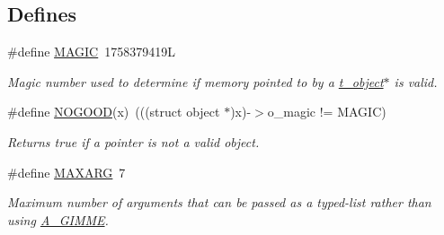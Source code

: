 \subsection*{Defines}
\begin{DoxyCompactItemize}
\item 
\hypertarget{group__obj_ga94630370ae389fb1189282fa0742f310}{
\#define \hyperlink{group__obj_ga94630370ae389fb1189282fa0742f310}{MAGIC}~1758379419L}
\label{group__obj_ga94630370ae389fb1189282fa0742f310}

\begin{DoxyCompactList}\small\item\em Magic number used to determine if memory pointed to by a \hyperlink{structt__object}{t\_\-object}$\ast$ is valid. \item\end{DoxyCompactList}\item 
\hypertarget{group__obj_gabf8c1d20a4f4e731d185c02820c91593}{
\#define \hyperlink{group__obj_gabf8c1d20a4f4e731d185c02820c91593}{NOGOOD}(x)~(((struct object $\ast$)x)-\/$>$o\_\-magic != MAGIC)}
\label{group__obj_gabf8c1d20a4f4e731d185c02820c91593}

\begin{DoxyCompactList}\small\item\em Returns true if a pointer is not a valid object. \item\end{DoxyCompactList}\item 
\#define \hyperlink{group__obj_ga4c171d1ccc50f0b6ce7ad2f475eeba32}{MAXARG}~7
\begin{DoxyCompactList}\small\item\em Maximum number of arguments that can be passed as a typed-\/list rather than using \hyperlink{group__atom_gga8aa6700e9f00b132eb376db6e39ade47a81c1a8550f038db16a619167a70a79b6}{A\_\-GIMME}. \item\end{DoxyCompactList}\end{DoxyCompactItemize}
